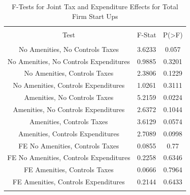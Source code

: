 \documentclass[12pt,a4paper]{article}
\begin{document}
\begin{table}[!htbp] \centering 
  \caption{F-Tests for Joint Tax and Expenditure Effects for Total Firm Start Ups} 
  \label{--Ftests} 
\begin{tabular}{@{\extracolsep{5pt}} ccc} 
\\[-1.8ex]\hline 
\hline \\[-1.8ex] 
Test & F-Stat & P(\textgreater F) \\ 
\hline \\[-1.8ex] 
No Amenities, No Controls Taxes & 3.6233 & 0.057 \\ 
No Amenities, No Controls Expenditures & 0.9885 & 0.3201 \\ 
No Amenities, Controls Taxes & 2.3806 & 0.1229 \\ 
No Amenities, Controls Expenditures & 1.0261 & 0.3111 \\ 
Amenities, No Controls Taxes & 5.2159 & 0.0224 \\ 
Amenities, No Controls Expenditures & 2.6372 & 0.1044 \\ 
Amenities, Controls Taxes & 3.6129 & 0.0574 \\ 
Amenities, Controls Expenditures & 2.7089 & 0.0998 \\ 
FE No Amenities, Controls Taxes & 0.0855 & 0.77 \\ 
FE No Amenities, Controls Expenditures & 0.2258 & 0.6346 \\ 
FE Amenities, Controls Taxes & 0.0666 & 0.7964 \\ 
FE Amenities, Controls Expenditures & 0.2144 & 0.6433 \\ 
\hline \\[-1.8ex] 
\end{tabular} 
\end{table} 
\end{document}
